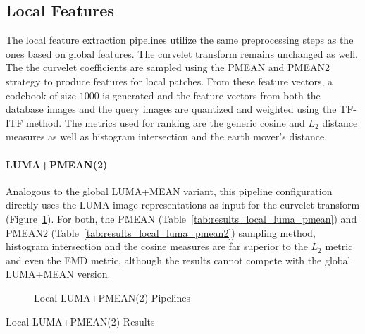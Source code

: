 \subsection{Local Features}

The local feature extraction pipelines utilize the same preprocessing steps as
the ones based on global features. The curvelet transform remains unchanged as
well. The the curvelet coefficients are sampled using the PMEAN and PMEAN2
strategy to produce features for local patches. From these feature vectors, a
codebook of size $1000$ is generated and the feature vectors from both the
database images and the query images are quantized and weighted using the
TF-ITF method. The metrics used for ranking are the generic cosine and $L_2$
distance measures as well as histogram intersection and the earth mover's
distance.

\paragraph{LUMA+PMEAN(2)}

Analogous to the global LUMA+MEAN variant, this pipeline configuration directly
uses the LUMA image representations as input for the curvelet transform
(Figure~\ref{fig:pipeline_local_luma_pmean}). For both, the PMEAN
(Table~\ref{tab:results_local_luma_pmean}) and PMEAN2
(Table~\ref{tab:results_local_luma_pmean2}) sampling method, histogram
intersection and the cosine measures are far superior to the $L_2$ metric and
even the EMD metric, although the results cannot compete with the global
LUMA+MEAN version.

\begin{figure}[h]
    \centering
    
    \caption[Local LUMA+PMEAN(2) Pipelines]{
        Local LUMA+PMEAN(2) Pipelines
    }
    \label{fig:pipeline_local_luma_pmean}
\end{figure}

\begin{table}[h]
    \centering
    \quad
    \caption[Local LUMA+PMEAN(2) Results]{
        Local LUMA+PMEAN(2) Results
    }
    \label{tab:results_local_luma_pmean_all}
\end{table}

